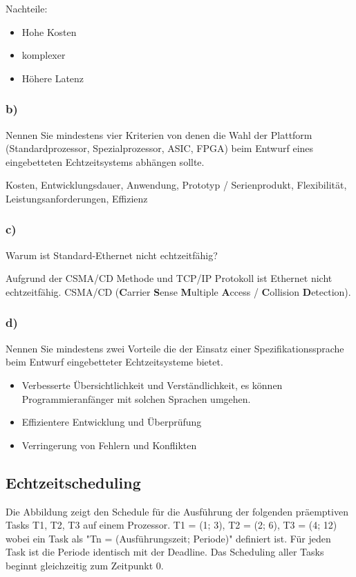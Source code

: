 Nachteile:
\begin{itemize}
  \item Hohe Kosten
  \item komplexer
  \item Höhere Latenz
\end{itemize}

\subsubsection{b)}
Nennen Sie mindestens vier Kriterien von denen die Wahl der Plattform (Standardprozessor,
Spezialprozessor, ASIC, FPGA) beim Entwurf eines eingebetteten Echtzeitsystems abhängen sollte.

Kosten, Entwicklungsdauer, Anwendung, Prototyp / Serienprodukt, Flexibilität, Leistungsanforderungen, Effizienz

\subsubsection{c)}
Warum ist Standard-Ethernet nicht echtzeitfähig?

Aufgrund der CSMA/CD Methode und TCP/IP Protokoll ist Ethernet nicht echtzeitfähig.
CSMA/CD (\textbf{C}arrier \textbf{S}ense \textbf{M}ultiple \textbf{A}ccess / \textbf{C}ollision \textbf{D}etection).

\subsubsection{d)}
Nennen Sie mindestens zwei Vorteile die der Einsatz einer Spezifikationssprache beim Entwurf
eingebetteter Echtzeitsysteme bietet.

\begin{itemize}
  \item Verbesserte Übersichtlichkeit und Verständlichkeit, es können Programmieranfänger mit solchen Sprachen umgehen.
  \item Effizientere Entwicklung und Überprüfung
  \item Verringerung von Fehlern und Konflikten
\end{itemize}

\subsection{Echtzeitscheduling}
Die Abbildung zeigt den Schedule für die Ausführung der folgenden präemptiven Tasks T1, T2, T3 auf einem
Prozessor.
T1 = (1; 3),
T2 = (2; 6),
T3 = (4; 12)
wobei ein Task als "Tn = (Ausführungszeit; Periode)" definiert ist. Für jeden Task ist die Periode identisch
mit der Deadline. Das Scheduling aller Tasks beginnt gleichzeitig zum Zeitpunkt 0.

